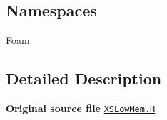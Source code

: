 \subsection*{Namespaces}
\begin{DoxyCompactItemize}
\item 
 \hyperlink{namespaceFoam}{Foam}
\end{DoxyCompactItemize}


\subsection{Detailed Description}
{\bfseries Original source file} \href{../../../home/carlo/data/GeN-Foam/GeN-Foam_ffn/GeN-Foam/GeN-Foam/classes/neutronics/XS/XSLowMem/XSLowMem.H}{\tt X\+S\+Low\+Mem.\+H} 